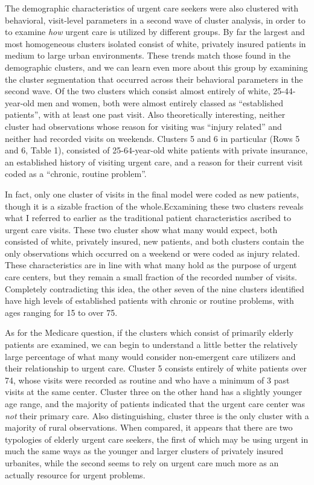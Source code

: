\documentclass[12pt,twoside]{reedthesis}
\begin{document}
  The demographic characteristics of urgent care seekers were also
  clustered with behavioral, visit-level parameters in a second wave of
  cluster analysis, in order to to examine \emph{how} urgent care is
  utilized by different groups. By far the largest and most homogeneous
  clusters isolated consist of white, privately insured patients in medium
  to large urban environments. These trends match those found in the
  demographic clusters, and we can learn even more about this group by
  examining the cluster segmentation that occurred across their behavioral
  parameters in the second wave. Of the two clusters which consist almost
  entirely of white, 25-44-year-old men and women, both were almost
  entirely classed as ``established patients'', with at least one past
  visit. Also theoretically interesting, neither cluster had observations
  whose reason for visiting was ``injury related'' and neither had
  recorded visits on weekends. Clusters 5 and 6 in particular (Rows 5 and
  6, Table 1), consisted of 25-64-year-old white patients with private
  insurance, an established history of visiting urgent care, and a reason
  for their current visit coded as a ``chronic, routine problem''.
  
  In fact, only one cluster of visits in the final model were coded as new
  patients, though it is a sizable fraction of the whole.Ecxamining these
  two clusters reveals what I referred to earlier as the traditional
  patient characteristics ascribed to urgent care visits. These two
  cluster show what many would expect, both consisted of white, privately
  insured, new patients, and both clusters contain the only observations
  which occurred on a weekend or were coded as injury related. These
  characteristics are in line with what many hold as the purpose of urgent
  care centers, but they remain a small fraction of the recorded number of
  visits. Completely contradicting this idea, the other seven of the nine
  clusters identified have high levels of established patients with
  chronic or routine problems, with ages ranging for 15 to over 75.
  
  As for the Medicare question, if the clusters which consist of primarily
  elderly patients are examined, we can begin to understand a little
  better the relatively large percentage of what many would consider
  non-emergent care utilizers and their relationship to urgent care.
  Cluster 5 consists entirely of white patients over 74, whose visits were
  recorded as routine and who have a minimum of 3 past visits at the same
  center. Cluster three on the other hand has a slightly younger age
  range, and the majority of patients indicated that the urgent care
  center was \emph{not} their primary care. Also distinguishing, cluster
  three is the only cluster with a majority of rural observations. When
  compared, it appears that there are two typologies of elderly urgent
  care seekers, the first of which may be using urgent in much the same
  ways as the younger and larger clusters of privately insured urbanites,
  while the second seems to rely on urgent care much more as an actually
  resource for urgent problems.
  
\end{document}
